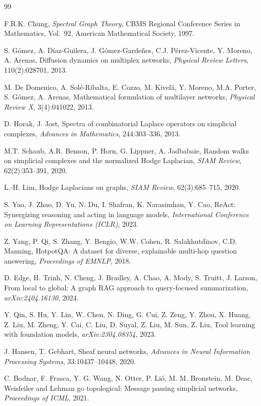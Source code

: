 \documentclass[11pt]{article}
\theoremstyle{definition}
\theoremstyle{remark}
\begin{document}
\begin{thebibliography}{99}

F.R.K. Chung,
\textit{Spectral Graph Theory},
CBMS Regional Conference Series in Mathematics, Vol.~92,
American Mathematical Society, 1997.

S. G{\'o}mez, A. D{\'i}az-Guilera, J. G{\'o}mez-Garde\~{n}es,
C.J. P{\'e}rez-Vicente, Y. Moreno, A. Arenas,
Diffusion dynamics on multiplex networks,
\textit{Physical Review Letters}, 110(2):028701, 2013.

M. De Domenico, A. Sol{\'e}-Ribalta, E. Cozzo, M. Kivel{\"a}, Y. Moreno,
M.A. Porter, S. G{\'o}mez, A. Arenas,
Mathematical formulation of multilayer networks,
\textit{Physical Review X}, 3(4):041022, 2013.

D. Horak, J. Jost,
Spectra of combinatorial Laplace operators on simplicial complexes,
\textit{Advances in Mathematics}, 244:303--336, 2013.

M.T. Schaub, A.R. Benson, P. Horn, G. Lippner, A. Jadbabaie,
Random walks on simplicial complexes and the normalized Hodge Laplacian,
\textit{SIAM Review}, 62(2):353--391, 2020.

L.-H. Lim,
Hodge Laplacians on graphs,
\textit{SIAM Review}, 62(3):685--715, 2020.

S. Yao, J. Zhao, D. Yu, N. Du, I. Shafran, K. Narasimhan, Y. Cao,
ReAct: Synergizing reasoning and acting in language models,
\textit{International Conference on Learning Representations (ICLR)}, 2023.

Z. Yang, P. Qi, S. Zhang, Y. Bengio, W.W. Cohen,
R. Salakhutdinov, C.D. Manning,
HotpotQA: A dataset for diverse, explainable multi-hop question answering,
\textit{Proceedings of EMNLP}, 2018.

D. Edge, H. Trinh, N. Cheng, J. Bradley, A. Chao, A. Mody, S. Truitt, J. Larson,
From local to global: A graph RAG approach to query-focused summarization,
\textit{arXiv:2404.16130}, 2024.

Y. Qin, S. Hu, Y. Lin, W. Chen, N. Ding, G. Cui, Z. Zeng, Y. Zhou, X. Huang,
Z. Liu, M. Zheng, Y. Cai, C. Liu, D. Suyal, Z. Liu, M. Sun, Z. Liu,
Tool learning with foundation models,
\textit{arXiv:2304.08354}, 2023.

J. Hansen, T. Gebhart,
Sheaf neural networks,
\textit{Advances in Neural Information Processing Systems}, 33:10437--10448, 2020.

C. Bodnar, F. Frasca, Y. G. Wang, N. Otter, P. Li{\'o}, M. M. Bronstein, M. Deac,
Weisfeiler and Lehman go topological: Message passing simplicial networks,
\textit{Proceedings of ICML}, 2021.

\end{thebibliography}
\end{document}

